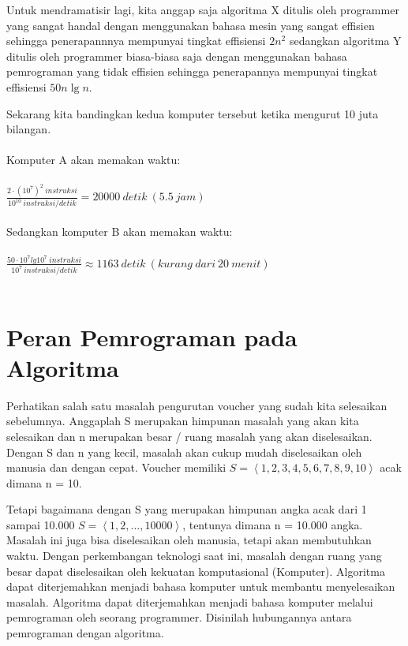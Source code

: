Untuk mendramatisir lagi, kita anggap saja algoritma X ditulis oleh programmer yang sangat handal dengan menggunakan bahasa mesin yang sangat effisien sehingga penerapannnya mempunyai tingkat effisiensi $2n^2$ sedangkan algoritma Y ditulis oleh programmer biasa-biasa saja dengan menggunakan bahasa pemrograman yang tidak effisien sehingga penerapannya mempunyai tingkat effisiensi $50n\lg n$.

Sekarang kita bandingkan kedua komputer tersebut ketika mengurut 10 juta bilangan. 
\hspace*{\fill}\\\hspace*{\fill}\\
Komputer A akan memakan waktu:
\hspace*{\fill}\\\hspace*{\fill}\\
$\frac{2\cdot(10^7)^2\ instruksi}{10^{10}\ instruksi/detik} = 20000\ detik\ (5.5\ jam)$
\hspace*{\fill}\\\hspace*{\fill}\\
Sedangkan komputer B akan memakan waktu:
\hspace*{\fill}\\\hspace*{\fill}\\
$\frac{50\cdot10^7lg10^7\ instruksi}{10^{7}\ instruksi/detik} \approx 1163\ detik\ (kurang\ dari\ 20\ menit)$
\hspace*{\fill}\\\hspace*{\fill}\\

\section{Peran Pemrograman pada Algoritma}

Perhatikan salah satu masalah pengurutan voucher yang sudah kita selesaikan sebelumnya. Anggaplah S merupakan himpunan masalah yang akan kita selesaikan dan n merupakan besar / ruang masalah yang akan diselesaikan. Dengan S dan n yang kecil, masalah akan cukup mudah diselesaikan oleh manusia dan dengan cepat. Voucher memiliki $S = \left\langle1,2,3,4,5,6,7,8,9,10\right\rangle$ acak dimana n = 10.

Tetapi bagaimana dengan S yang merupakan himpunan angka acak dari 1 sampai 10.000 $S = \left\langle1,2, ..., 10000\right\rangle$, tentunya dimana n = 10.000 angka. Masalah ini juga bisa diselesaikan oleh manusia, tetapi akan membutuhkan waktu. Dengan perkembangan teknologi saat ini, masalah dengan ruang yang besar dapat diselesaikan oleh kekuatan komputasional (Komputer). Algoritma dapat diterjemahkan menjadi bahasa komputer untuk membantu menyelesaikan masalah. Algoritma dapat diterjemahkan menjadi bahasa komputer melalui pemrograman oleh seorang programmer.  Disinilah hubungannya antara pemrograman dengan algoritma. 


